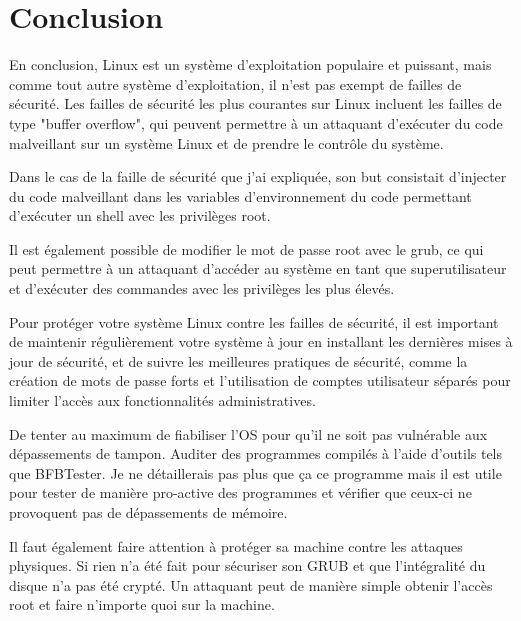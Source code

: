 \documentclass[12pt,a4paper]{article}
\begin{document}
        \section{Conclusion}
        \begin{flushleft}
            \noindent En conclusion, Linux est un système d'exploitation populaire et puissant, mais comme tout autre système d'exploitation, il n'est pas exempt de failles de sécurité. Les failles de sécurité les plus courantes sur Linux incluent les failles de type "buffer overflow", qui peuvent permettre à un attaquant d'exécuter du code malveillant sur un système Linux et de prendre le contrôle du système.
            \item Dans le cas de la faille de sécurité que j'ai expliquée, son but consistait d'injecter du code malveillant dans les variables d'environnement du code permettant d'exécuter un shell avec les privilèges root.
            \item Il est également possible de modifier le mot de passe root avec le grub, ce qui peut permettre à un attaquant d'accéder au système en tant que superutilisateur et d'exécuter des commandes avec les privilèges les plus élevés. 
            \item Pour protéger votre système Linux contre les failles de sécurité, il est important de maintenir régulièrement votre système à jour en installant les dernières mises à jour de sécurité, et de suivre les meilleures pratiques de sécurité, comme la création de mots de passe forts et l'utilisation de comptes utilisateur séparés pour limiter l'accès aux fonctionnalités administratives.
            \item De tenter au maximum de fiabiliser l'OS pour qu'il ne soit pas vulnérable aux dépassements de tampon. Auditer des programmes compilés à l'aide d'outils tels que BFBTester. Je ne détaillerais pas plus que ça ce programme mais il est utile pour tester de manière pro-active des programmes et vérifier que ceux-ci ne provoquent pas de dépassements de mémoire.
            \item Il faut également faire attention à protéger sa machine contre les attaques physiques. Si rien n'a été fait pour sécuriser son GRUB et que l'intégralité du disque n'a pas été crypté. Un attaquant peut de manière simple obtenir l'accès root et faire n'importe quoi sur la machine.
        \end{flushleft}

        \newpage
        \nocite{*}
	
	
\end{document}
